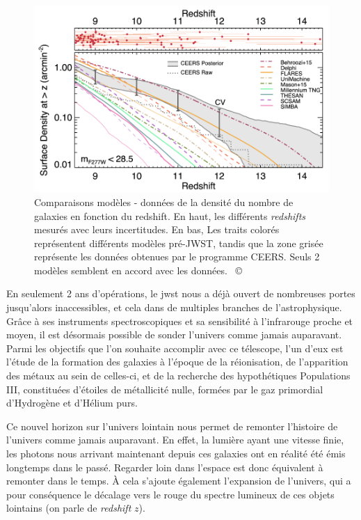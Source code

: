 \documentclass[12pt, a4paper]{article}
\newcommand{\customcite}[1]{\mbox{
  {\small \copyright} \cite{#1}}
}
\begin{document}
\begin{figure}
  \centering
  \includegraphics[scale=0.5]{assets/ceers_number_galaxies.png}
  \caption{Comparaisons modèles - données de la densité du nombre de galaxies en fonction du redshift. En haut, les différents \textit{redshifts} mesurés avec leurs incertitudes. En bas, Les traits colorés représentent différents modèles pré-JWST, tandis que la zone grisée représente les données obtenues par le programme CEERS. Seuls 2 modèles semblent en accord avec les données. \customcite{2023arXiv231104279F}}
  \label{fig:densite_galaxies}
\end{figure}

En seulement 2 ans d'opérations, le \gls{jwst} nous a déjà ouvert de nombreuses portes jusqu'alors inaccessibles, et cela dans de multiples branches de l'astrophysique. Grâce à ses instruments spectroscopiques et sa sensibilité à l'infrarouge proche et moyen, il est désormais possible de sonder l'univers comme jamais auparavant. Parmi les objectifs que l'on souhaite accomplir avec ce télescope, l'un d'eux est l'étude de la formation des galaxies à l'époque de la réionisation, de l'apparition des métaux au sein de celles-ci, et de la recherche des hypothétiques Populations III, constituées d'étoiles de métallicité nulle, formées par le gaz primordial d'Hydrogène et d'Hélium purs.

Ce nouvel horizon sur l'univers lointain nous permet de remonter l'histoire de l'univers comme jamais auparavant. En effet, la lumière ayant une vitesse finie, les photons nous arrivant maintenant depuis ces galaxies ont en réalité été émis longtemps dans le passé. Regarder loin dans l'espace est donc équivalent à remonter dans le temps. À cela s'ajoute également l'expansion de l'univers, qui a pour conséquence le décalage vers le rouge du spectre lumineux de ces objets lointains (on parle de \textit{redshift} $z$).
\end{document}
